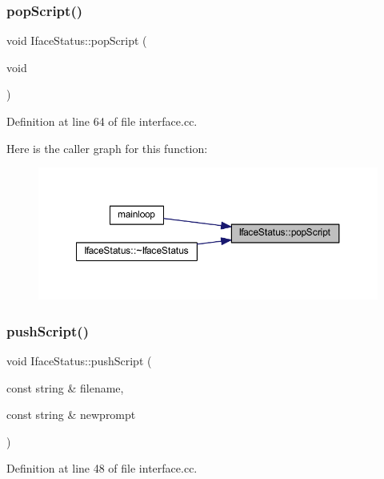 \subsubsection{\texorpdfstring{popScript()}{popScript()}}
{\footnotesize\ttfamily void Iface\+Status\+::pop\+Script (\begin{DoxyParamCaption}\item[{void}]{ }\end{DoxyParamCaption})}



Definition at line 64 of file interface.\+cc.

Here is the caller graph for this function\+:
\nopagebreak
\begin{figure}[H]
\begin{center}
\leavevmode
\includegraphics[width=350pt]{class_iface_status_a8091c5bf341cfb11997893f0a35ba516_icgraph}
\end{center}
\end{figure}
\mbox{\label{class_iface_status_a4be96e0e55138d3b6a74496b6ae61a88}} 
\subsubsection{\texorpdfstring{pushScript()}{pushScript()}}
{\footnotesize\ttfamily void Iface\+Status\+::push\+Script (\begin{DoxyParamCaption}\item[{const string \&}]{filename,  }\item[{const string \&}]{newprompt }\end{DoxyParamCaption})}



Definition at line 48 of file interface.\+cc.

